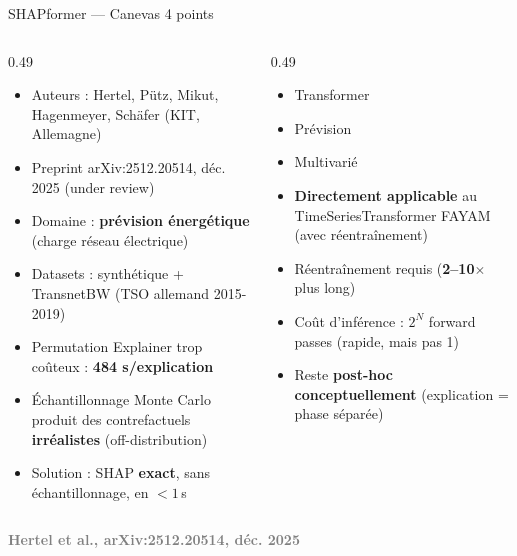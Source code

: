 \documentclass[10pt]{beamer}
\newcommand{\source}[1]{\vspace{4pt}\hfill{\textcolor{gray}{\textbf{\tiny #1}}}}
\begin{document}
\begin{frame}{SHAPformer — Canevas 4 points}
  \begin{columns}
    \begin{column}{0.49\textwidth}
      \begin{ctxbox}
        \begin{itemize}
          \item Auteurs : Hertel, Pütz, Mikut, Hagenmeyer, Schäfer (KIT, Allemagne)
          \item Preprint arXiv:2512.20514, déc. 2025 (under review)
          \item Domaine : \textbf{prévision énergétique} (charge réseau électrique)
          \item Datasets : synthétique + TransnetBW (TSO allemand 2015-2019)
        \end{itemize}
      \end{ctxbox}
      \begin{probbox}
        \begin{itemize}
          \item Permutation Explainer trop coûteux : \textbf{484 s/explication}
          \item Échantillonnage Monte Carlo produit des contrefactuels \textbf{irréalistes} (off-distribution)
          \item Solution : SHAP \textbf{exact}, sans échantillonnage, en $<1$\,s
        \end{itemize}
      \end{probbox}
    \end{column}
    \begin{column}{0.49\textwidth}
      \begin{transposbox}
        \begin{itemize}
          \item Transformer \checkmark
          \item Prévision \checkmark
          \item Multivarié \checkmark
          \item \textbf{Directement applicable} au TimeSeriesTransformer FAYAM (avec réentraînement)
        \end{itemize}
      \end{transposbox}
      \begin{limitbox}
        \begin{itemize}
          \item Réentraînement requis (\textbf{2--10$\times$} plus long)
          \item Coût d'inférence : $2^N$ forward passes (rapide, mais pas 1)
          \item Reste \textbf{post-hoc conceptuellement} (explication = phase séparée)
        \end{itemize}
      \end{limitbox}
    \end{column}
  \end{columns}
  \source{Hertel et al., arXiv:2512.20514, déc. 2025}
\end{frame}
\end{document}
